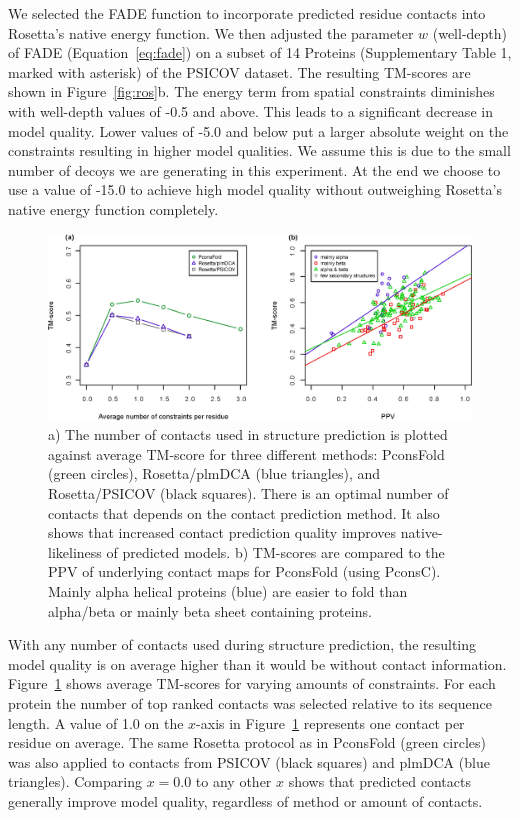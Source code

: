 \documentclass{bioinfo}
\begin{document}
We selected the FADE function to incorporate predicted residue
contacts into Rosetta's native energy function. We then adjusted the
parameter $w$ (well-depth) of FADE (Equation~\ref{eq:fade}) on a
subset of 14 Proteins (Supplementary Table 1, marked with asterisk) of the PSICOV
dataset. The resulting TM-scores are shown in Figure~\ref{fig:ros}b. The energy term from spatial constraints diminishes with
well-depth values of -0.5 and above. This leads to a significant
decrease in model quality. Lower values of -5.0 and below put a larger
absolute weight on the constraints resulting in higher model
qualities. We assume this is due to the small number of decoys we are
generating in this experiment. At the end we choose to use a value of -15.0 to achieve
high model quality without outweighing Rosetta's native energy
function completely.


\begin{figure}[!tpb]%
\centerline{\includegraphics[scale=0.7]{figures/tmscores.eps}}
\caption{a) The number of contacts used in structure prediction is
  plotted against average TM-score for three different methods:
  PconsFold (green circles), Rosetta/plmDCA (blue triangles), and
  Rosetta/PSICOV (black squares). There is an optimal number of
  contacts that depends on the contact prediction method. It also
  shows that increased contact prediction quality improves
  native-likeliness of predicted models. b) TM-scores are compared
  to the PPV of underlying contact maps for PconsFold (using
  PconsC). Mainly alpha helical proteins (blue) are easier to fold
  than alpha/beta or mainly beta sheet containing
  proteins.}\label{fig:main}
\end{figure}

With any number of contacts used during structure prediction, the
resulting model quality is on average higher than it would be without
contact information. Figure~\ref{fig:main} shows average TM-scores
for varying amounts of constraints. For each protein the number of top
ranked contacts was selected relative to its sequence length. A value
of 1.0 on the $x$-axis in Figure~\ref{fig:main} represents one
contact per residue on average. The same Rosetta protocol as in
PconsFold (green circles) was also applied to contacts from PSICOV
(black squares) and plmDCA (blue triangles). Comparing $x=0.0$ to any
other $x$ shows that predicted contacts generally improve model
quality, regardless of method or amount of contacts. 
\end{document}
